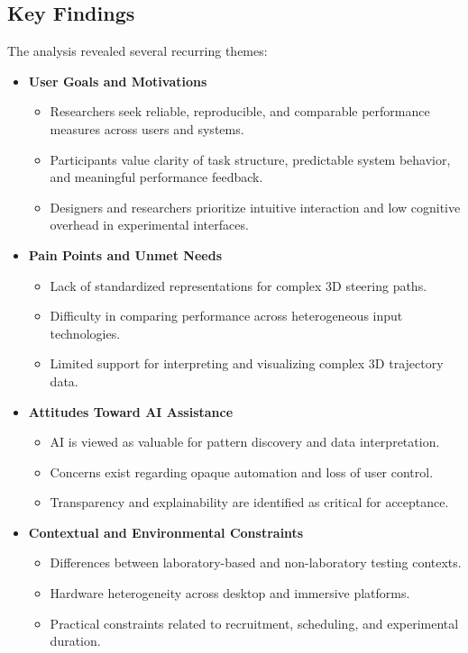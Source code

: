 \documentclass[sigconf]{acmart}
\begin{document}
\subsection{Key Findings}

The analysis revealed several recurring themes:

\begin{itemize}

  \item \textbf{User Goals and Motivations}
  \begin{itemize}
    \item Researchers seek reliable, reproducible, and comparable performance measures across users and systems.
    \item Participants value clarity of task structure, predictable system behavior, and meaningful performance feedback.
    \item Designers and researchers prioritize intuitive interaction and low cognitive overhead in experimental interfaces.
  \end{itemize}

  \item \textbf{Pain Points and Unmet Needs}
  \begin{itemize}
    \item Lack of standardized representations for complex 3D steering paths.
    \item Difficulty in comparing performance across heterogeneous input technologies.
    \item Limited support for interpreting and visualizing complex 3D trajectory data.
  \end{itemize}

  \item \textbf{Attitudes Toward AI Assistance}
  \begin{itemize}
    \item AI is viewed as valuable for pattern discovery and data interpretation.
    \item Concerns exist regarding opaque automation and loss of user control.
    \item Transparency and explainability are identified as critical for acceptance.
  \end{itemize}

  \item \textbf{Contextual and Environmental Constraints}
  \begin{itemize}
    \item Differences between laboratory-based and non-laboratory testing contexts.
    \item Hardware heterogeneity across desktop and immersive platforms.
    \item Practical constraints related to recruitment, scheduling, and experimental duration.
  \end{itemize}

\end{itemize}
\end{document}
